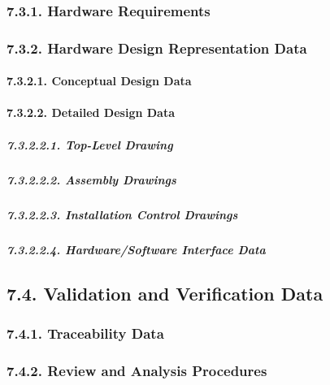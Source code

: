 \documentclass[
]{article}
\begin{document}
\hypertarget{hardware-requirements}{%
\subsubsection{7.3.1. Hardware
Requirements}\label{hardware-requirements}}

\hypertarget{hardware-design-representation-data}{%
\subsubsection{7.3.2. Hardware Design Representation
Data}\label{hardware-design-representation-data}}

\hypertarget{conceptual-design-data}{%
\paragraph{7.3.2.1. Conceptual Design
Data}\label{conceptual-design-data}}

\hypertarget{detailed-design-data}{%
\paragraph{7.3.2.2. Detailed Design Data}\label{detailed-design-data}}

\hypertarget{top-level-drawing}{%
\subparagraph{7.3.2.2.1. Top-Level Drawing}\label{top-level-drawing}}

\hypertarget{assembly-drawings}{%
\subparagraph{7.3.2.2.2. Assembly Drawings}\label{assembly-drawings}}

\hypertarget{installation-control-drawings}{%
\subparagraph{7.3.2.2.3. Installation Control
Drawings}\label{installation-control-drawings}}

\hypertarget{hardwaresoftware-interface-data}{%
\subparagraph{7.3.2.2.4. Hardware/Software Interface
Data}\label{hardwaresoftware-interface-data}}

\hypertarget{validation-and-verification-data}{%
\subsection{7.4. Validation and Verification
Data}\label{validation-and-verification-data}}

\hypertarget{traceability-data}{%
\subsubsection{7.4.1. Traceability Data}\label{traceability-data}}

\hypertarget{review-and-analysis-procedures}{%
\subsubsection{7.4.2. Review and Analysis
Procedures}\label{review-and-analysis-procedures}}
\end{document}

